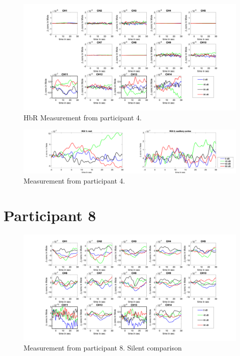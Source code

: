 \begin{figure}[H]
  \centering
    \includegraphics[scale=.35]{bilder/HbR_Mole/sub_lin_s_HbR.png}
  \caption{HbR Measurement from participant 4.}
\end{figure}

\begin{figure}[H]
  \centering
    \includegraphics[scale=.29]{bilder/ROI/sub_lin_s_HbO.png}
  \caption{Measurement from participant  4.}
\end{figure}

\newpage



\section {Participant 8}

\begin{figure}[H]
  \centering
    \includegraphics[scale=.4]{bilder/HbO_Mole/sub_luca2_s_HbO.png}
  \caption{Measurement from participant 8. Silent comparison}
  \label{fig:somesignal}
\end{figure}

